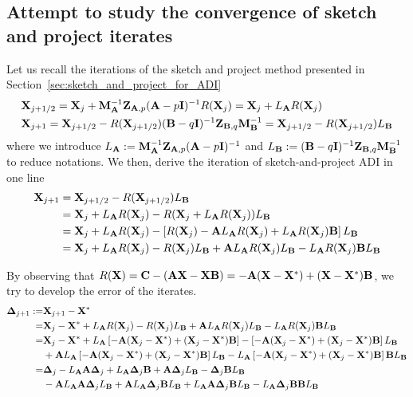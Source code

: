 \documentclass[10pt]{article}
\theoremstyle{definition}
\begin{document}
\subsection{Attempt to study the convergence of sketch and project iterates}

Let us recall the iterations of the sketch and project method presented in Section~\ref{sec:sketch_and_project_for_ADI}
\begin{align}
    &{\bf X}_{j+1/2} = {\bf X}_{j} + {\bf M}_{{\bf A}}^{-1} {\bf Z}_{{\bf A},p}({\bf A} - p {\bf I})^{-1} R({\bf X}_j) = {\bf X}_{j} + L_{{\bf A}} R({\bf X}_j) \label{eq:adi_1st_step} \\
    &{\bf X}_{j+1} = {\bf X}_{j+1/2} -R({\bf X}_{j+1/2}) ({\bf B} -q {\bf I})^{-1}{\bf Z}_{{\bf B},q} {\bf M}_{{\bf B}}^{-1} = {\bf X}_{j+1/2} - R({\bf X}_{j+1/2}) L_{{\bf B}} \label{eq:adi_2nd_step}
\end{align}
where we introduce $L_{{\bf A}} := {\bf M}_{{\bf A}}^{-1} {\bf Z}_{{\bf A},p}({\bf A} - p {\bf I})^{-1}$ and $L_{{\bf B}} := ({\bf B} -q {\bf I})^{-1}{\bf Z}_{{\bf B},q} {\bf M}_{{\bf B}}^{-1}$ to reduce notations. We then, derive the iteration of sketch-and-project ADI in one line
\begin{align*}
    {\bf X}_{j+1} &= {\bf X}_{j+1/2} - R({\bf X}_{j+1/2}) L_{{\bf B}} \\
              &= {\bf X}_{j} + L_{{\bf A}} R({\bf X}_j) - R({\bf X}_{j} + L_{{\bf A}} R({\bf X}_j)) L_{{\bf B}} \\
              &= {\bf X}_{j} + L_{{\bf A}} R({\bf X}_j) - \left[R({\bf X}_{j}) - {\bf A} L_{{\bf A}} R({\bf X}_j) + L_{{\bf A}} R({\bf X}_j) {\bf B} \right] L_{{\bf B}} \\
              &= {\bf X}_{j} + L_{{\bf A}} R({\bf X}_j) - R({\bf X}_{j}) L_{{\bf B}} + {\bf A} L_{{\bf A}} R({\bf X}_j) L_{{\bf B}} - L_{{\bf A}} R({\bf X}_j) {\bf B} L_{{\bf B}}
\end{align*}

By observing that $R({\bf X}) = {\bf C} - ({\bf A} {\bf X} - {\bf X} {\bf B}) = - {\bf A} ({\bf X} - {\bf X}^*) + ({\bf X} - {\bf X}^*) {\bf B}$, we try to develop the error of the iterates.
\begin{align*}
    {\bf \Delta}_{j+1} :=& {\bf X}_{j+1} - {\bf X}^* \\
    =& {\bf X}_{j} - {\bf X}^* + L_{{\bf A}} R({\bf X}_j) - R({\bf X}_{j}) L_{{\bf B}} + {\bf A} L_{{\bf A}} R({\bf X}_j) L_{{\bf B}} - L_{{\bf A}} R({\bf X}_j) {\bf B} L_{{\bf B}} \\
    =& {\bf X}_{j} - {\bf X}^* + L_{{\bf A}} \left[- {\bf A} ({\bf X}_{j} - {\bf X}^*) + ({\bf X}_{j} - {\bf X}^*) {\bf B}\right] - \left[- {\bf A} ({\bf X}_{j} - {\bf X}^*) + ({\bf X}_{j} - {\bf X}^*) {\bf B}\right] L_{{\bf B}} \\
     &+ {\bf A} L_{{\bf A}} \left[- {\bf A} ({\bf X}_{j} - {\bf X}^*) + ({\bf X}_{j} - {\bf X}^*) {\bf B}\right] L_{{\bf B}} - L_{{\bf A}} \left[- {\bf A} ({\bf X}_{j} - {\bf X}^*) + ({\bf X}_{j} - {\bf X}^*) {\bf B}\right] {\bf B} L_{{\bf B}} \\
    =& {\bf \Delta}_{j} - L_{{\bf A}} {\bf A} {\bf \Delta}_{j} + L_{{\bf A}} {\bf \Delta}_{j} {\bf B} + {\bf A} {\bf \Delta}_{j} L_{{\bf B}} - {\bf \Delta}_{j} {\bf B} L_{{\bf B}} \\
     &- {\bf A} L_{{\bf A}} {\bf A} {\bf \Delta}_{j} L_{{\bf B}} + {\bf A} L_{{\bf A}} {\bf \Delta}_{j} {\bf B} L_{{\bf B}} + L_{{\bf A}} {\bf A} {\bf \Delta}_{j} {\bf B} L_{{\bf B}} - L_{{\bf A}} {\bf \Delta}_{j} {\bf B} {\bf B} L_{{\bf B}}
\end{align*}
\end{document}
